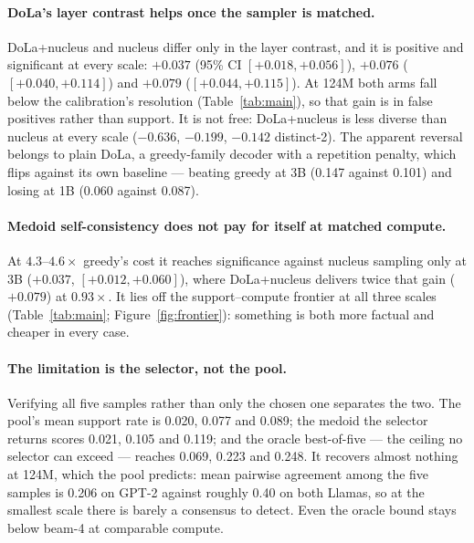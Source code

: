 \documentclass[11pt]{article}
\begin{document}
\paragraph{DoLa's layer contrast helps once the sampler is matched.}
DoLa+nucleus and nucleus differ only in the layer contrast, and it is positive
and significant at every scale: $+0.037$ (95\% CI $[+0.018, +0.056]$),
$+0.076$ ($[+0.040, +0.114]$) and $+0.079$ ($[+0.044, +0.115]$). At 124M both
arms fall below the calibration's resolution (Table~\ref{tab:main}), so that
gain is in false positives rather than support. It is not free: DoLa+nucleus is
less diverse than nucleus at every scale ($-0.636$, $-0.199$, $-0.142$
distinct-2). The apparent reversal belongs to plain DoLa, a greedy-family
decoder with a repetition penalty, which flips against its own baseline ---
beating greedy at 3B (0.147 against 0.101) and losing at 1B (0.060 against
0.087).

\paragraph{Medoid self-consistency does not pay for itself at matched compute.} At
$4.3$--$4.6\times$ greedy's cost it reaches significance against nucleus
sampling only at 3B ($+0.037$, $[+0.012, +0.060]$), where DoLa+nucleus delivers
twice that gain ($+0.079$) at $0.93\times$. It lies off the support--compute
frontier at all three scales (Table~\ref{tab:main};
Figure~\ref{fig:frontier}): something is both more factual and cheaper in every
case.

\paragraph{The limitation is the selector, not the pool.} Verifying all five
samples rather than only the chosen one separates the two. The pool's mean
support rate is 0.020, 0.077 and 0.089; the medoid the selector returns scores
0.021, 0.105 and 0.119; and the oracle best-of-five --- the ceiling no selector
can exceed --- reaches 0.069, 0.223 and 0.248. It recovers almost nothing at
124M, which the pool predicts: mean pairwise agreement among the five samples
is 0.206 on GPT-2 against roughly 0.40 on both Llamas, so at the smallest scale
there is barely a consensus to detect. Even the oracle bound stays below beam-4
at comparable compute.
\end{document}
